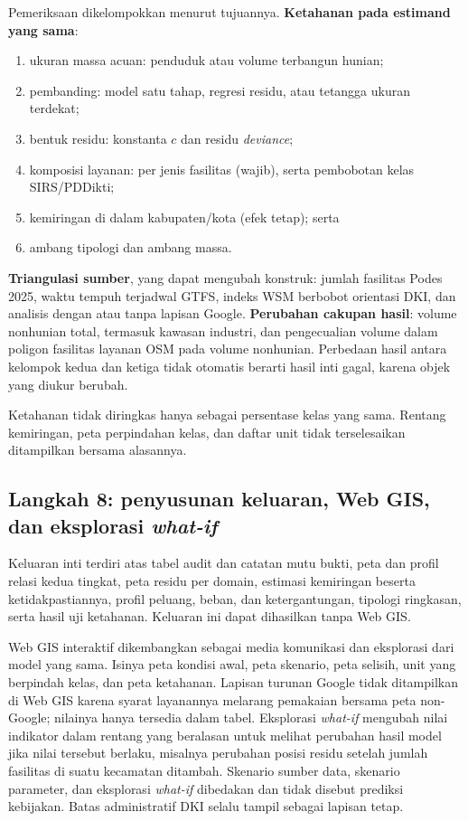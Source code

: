 \documentclass[12pt,a4paper,oneside,openany,indonesian]{report}
\begin{document}
Pemeriksaan dikelompokkan menurut tujuannya. \textbf{Ketahanan pada
estimand yang sama}:

\begin{enumerate}
\tightlist
\item
  ukuran massa acuan: penduduk atau volume terbangun hunian;
\item
  pembanding: model satu tahap, regresi residu, atau tetangga ukuran
  terdekat;
\item
  bentuk residu: konstanta $c$ dan residu \emph{deviance};
\item
  komposisi layanan: per jenis fasilitas (wajib), serta pembobotan
  kelas SIRS/PDDikti;
\item
  kemiringan di dalam kabupaten/kota (efek tetap); serta
\item
  ambang tipologi dan ambang massa.
\end{enumerate}

\noindent \textbf{Triangulasi sumber}, yang dapat mengubah konstruk:
jumlah fasilitas Podes 2025, waktu tempuh terjadwal GTFS, indeks WSM
berbobot orientasi DKI, dan analisis dengan atau tanpa lapisan Google.
\textbf{Perubahan cakupan hasil}: volume nonhunian total, termasuk
kawasan industri, dan pengecualian volume dalam poligon fasilitas
layanan OSM pada volume
nonhunian. Perbedaan hasil antara kelompok kedua dan ketiga tidak
otomatis berarti hasil inti gagal, karena objek yang diukur berubah.

Ketahanan tidak diringkas hanya sebagai persentase kelas yang sama.
Rentang kemiringan, peta perpindahan kelas, dan daftar unit tidak
terselesaikan ditampilkan bersama alasannya.

\subsection{Langkah 8: penyusunan keluaran, Web GIS, dan eksplorasi
\emph{what-if}}\label{langkah-8-penyusunan-keluaran-dan-penguatan-opsional}

Keluaran inti terdiri atas tabel audit dan catatan mutu bukti, peta dan
profil relasi kedua tingkat, peta residu per domain, estimasi kemiringan
beserta ketidakpastiannya, profil peluang, beban, dan ketergantungan, tipologi ringkasan,
serta hasil uji ketahanan. Keluaran ini dapat dihasilkan tanpa Web GIS.

Web GIS interaktif dikembangkan sebagai media komunikasi dan eksplorasi
dari model yang sama. Isinya peta kondisi awal, peta skenario, peta
selisih, unit yang berpindah kelas, dan peta ketahanan. Lapisan turunan
Google tidak ditampilkan di Web GIS karena syarat layanannya melarang
pemakaian bersama peta non-Google; nilainya hanya tersedia dalam tabel. Eksplorasi
\emph{what-if} mengubah nilai indikator dalam rentang yang beralasan
untuk melihat perubahan hasil model jika nilai tersebut berlaku,
misalnya perubahan posisi residu setelah jumlah fasilitas di suatu
kecamatan ditambah. Skenario sumber data,
skenario parameter, dan eksplorasi \emph{what-if} dibedakan dan tidak
disebut prediksi kebijakan. Batas administratif DKI selalu tampil
sebagai lapisan tetap.
\end{document}
